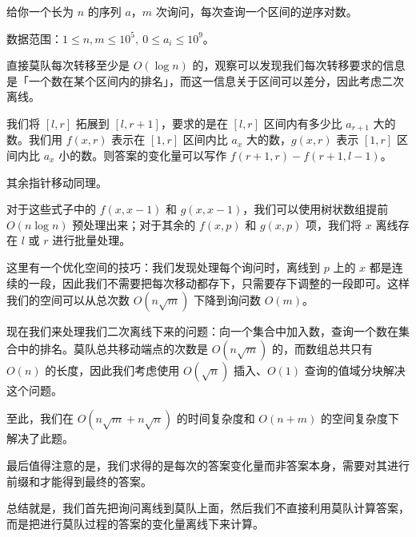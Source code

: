 给你一个长为 $n$ 的序列 $a$，$m$ 次询问，每次查询一个区间的逆序对数。

数据范围：$1 \le n,m \le 10^5,\ 0 \le a_i \le 10^9$。

直接莫队每次转移至少是 $O(\log n)$ 的，观察可以发现我们每次转移要求的信息是「一个数在某个区间内的排名」，而这一信息关于区间可以差分，因此考虑二次离线。

我们将 $[l, r]$ 拓展到 $[l, r + 1]$，要求的是在 $[l, r]$ 区间内有多少比 $a_{r+1}$ 大的数。我们用 $f(x, r)$ 表示在 $[1, r]$ 区间内比 $a_x$ 大的数，$g(x, r)$ 表示 $[1, r]$ 区间内比 $a_x$ 小的数。则答案的变化量可以写作 $f(r + 1, r) - f(r + 1, l - 1)$。

其余指针移动同理。

对于这些式子中的 $f(x, x - 1)$ 和 $g(x, x - 1)$，我们可以使用树状数组提前 $O(n \log n)$ 预处理出来；对于其余的 $f(x, p)$ 和 $g(x, p)$ 项，我们将 $x$ 离线存在 $l$ 或 $r$ 进行批量处理。

这里有一个优化空间的技巧：我们发现处理每个询问时，离线到 $p$ 上的 $x$ 都是连续的一段，因此我们不需要把每次移动都存下，只需要存下调整的一段即可。这样我们的空间可以从总次数 $O(n \sqrt{m})$ 下降到询问数 $O(m)$。

现在我们来处理我们二次离线下来的问题：向一个集合中加入数，查询一个数在集合中的排名。莫队总共移动端点的次数是 $O(n \sqrt{m})$ 的，而数组总共只有 $O(n)$ 的长度，因此我们考虑使用 $O(\sqrt{n})$ 插入、$O(1)$ 查询的值域分块解决这个问题。

至此，我们在 $O(n \sqrt{m} + n \sqrt{n})$ 的时间复杂度和 $O(n + m)$ 的空间复杂度下解决了此题。

最后值得注意的是，我们求得的是每次的答案变化量而非答案本身，需要对其进行前缀和才能得到最终的答案。

总结就是，我们首先把询问离线到莫队上面，然后我们不直接利用莫队计算答案，而是把进行莫队过程的答案的变化量离线下来计算。